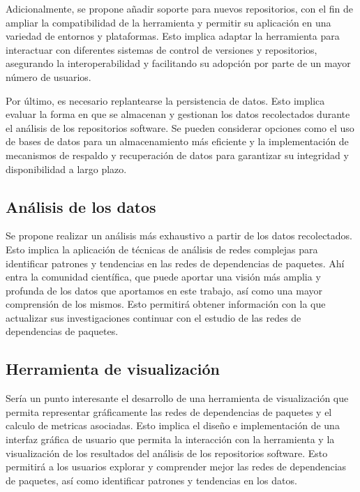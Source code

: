 Adicionalmente, se propone añadir soporte para nuevos repositorios, con el fin de ampliar la compatibilidad de la herramienta y 
permitir su aplicación en una variedad de entornos y plataformas. Esto implica adaptar la herramienta para interactuar con 
diferentes sistemas de control de versiones y repositorios, asegurando la interoperabilidad y facilitando su adopción por 
parte de un mayor número de usuarios.

Por último, es necesario replantearse la persistencia de datos. Esto implica evaluar la forma en que se almacenan y gestionan 
los datos recolectados durante el análisis de los repositorios software. Se pueden considerar opciones como el uso de bases de 
datos para un almacenamiento más eficiente y la implementación de mecanismos de respaldo y recuperación de datos para garantizar
 su integridad y disponibilidad a largo plazo.

\subsection{Análisis de los datos}

Se propone realizar un análisis más exhaustivo a partir de los datos recolectados. Esto implica la aplicación de técnicas de análisis
de redes complejas para identificar patrones y tendencias en las redes de dependencias de paquetes. Ahí entra la comunidad científica, que puede
aportar una visión más amplia y profunda de los datos que aportamos en este trabajo, así como una mayor comprensión de los mismos. Esto permitirá 
obtener información con la que actualizar sus investigaciones continuar con el estudio de las redes de dependencias de paquetes.

\subsection{Herramienta de visualización}

Sería un punto interesante el desarrollo de una herramienta de visualización que permita representar gráficamente las redes de dependencias
de paquetes y el calculo de metricas asociadas. Esto implica el diseño e implementación de una interfaz gráfica de usuario que permita la 
interacción con la herramienta y la visualización de los resultados del análisis de los repositorios software. Esto permitirá a los usuarios
explorar y comprender mejor las redes de dependencias de paquetes, así como identificar patrones y tendencias en los datos.
